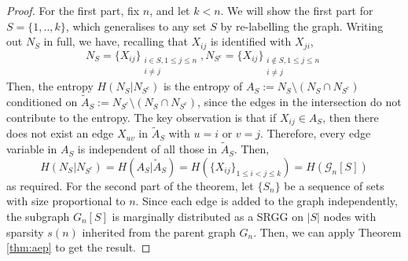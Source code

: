 \documentclass[10pt,a4paper]{amsart}
\newcommand{\graph}{\mathcal{G}}
\begin{document}
\begin{proof}
    For the first part, fix $n$, and let $k < n$. We will show the first part for ${S} = \{1,..,k\}$,  which generalises to any set ${S}$ by re-labelling the graph. Writing out $N_{{S}}$ in full, we have, recalling that $X_{ij}$ is identified with $X_{ji}$,
    \begin{equation}
        N_{{S}} = \{X_{ij}\}_{\substack{i \in {S}, 1 \leq j \leq n\\
                                    i \neq j}}, N_{{S}^c} = \{X_{ij}\}_{\substack{i \notin {S}, 1 \leq j \leq n\\
                                    i \neq j}}
    \end{equation}
    Then, the entropy $H(N_{S}|N_{S^c
    })$ is the entropy of $A_{{S}} := N_{S} \setminus (N_{S} \cap N_{{S}^c})$ conditioned on $\widetilde{A}_{S} := N_{{S}^c} \setminus (N_{{S}} \cap N_{{S}^c})$, since the edges in the intersection do not contribute to the entropy. The key observation is that if $X_{ij} \in A_{S}$, then there does not exist an edge $X_{uv}$ in $\widetilde{A}_{S}$ with $u = i$ or $v = j$. Therefore, every edge variable in $A_{S}$ is independent of all those in $\widetilde{A}_{S}$. Then,
    \begin{equation*}
        H(N_S|N_{S^c}) = H(A_{S}|\widetilde{A}_{S}) = H(\{X_{ij}\}_{1\leq i<j \leq k}) = H(\graph_n[S])
    \end{equation*}
    as required. For the second part of the theorem, let $\{S_n\}$ be a sequence of sets with size proportional to $n$. Since each edge is added to the graph independently, the subgraph $G_n[S]$ is marginally distributed as a SRGG on $|S|$ nodes with sparsity $s(n)$ inherited from the parent graph $G_n$. Then, we can apply Theorem \ref{thm:aep} to get the result.
\end{proof}
\end{document}
